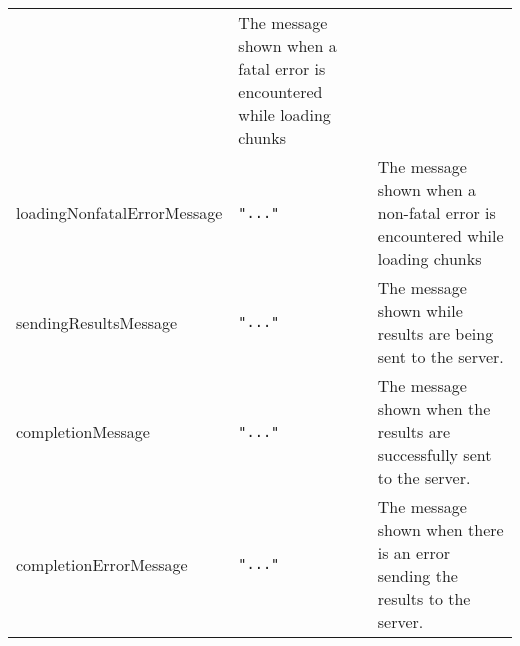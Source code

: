 \documentclass[
]{article}
\begin{document}
\begin{RaggedRight}
\begin{longtable}[]{p{1.7in}p{1in}p{3.15in}}
\begin{minipage}[t]{0.28\columnwidth}
\end{minipage} & \begin{minipage}[t]{0.37\columnwidth}\raggedright
The message shown when a fatal error is encountered while loading
chunks\strut
\end{minipage}\tabularnewline
\begin{minipage}[t]{0.26\columnwidth}\raggedright
loadingNonfatalErrorMessage\strut
\end{minipage} & \begin{minipage}[t]{0.28\columnwidth}\raggedright
\texttt{"..."}\strut
\end{minipage} & \begin{minipage}[t]{0.37\columnwidth}\raggedright
The message shown when a non-fatal error is encountered while loading
chunks\strut
\end{minipage}\tabularnewline
\begin{minipage}[t]{0.26\columnwidth}\raggedright
sendingResultsMessage\strut
\end{minipage} & \begin{minipage}[t]{0.28\columnwidth}\raggedright
\texttt{"..."}\strut
\end{minipage} & \begin{minipage}[t]{0.37\columnwidth}\raggedright
The message shown while results are being sent to the server.\strut
\end{minipage}\tabularnewline
\begin{minipage}[t]{0.26\columnwidth}\raggedright
completionMessage\strut
\end{minipage} & \begin{minipage}[t]{0.28\columnwidth}\raggedright
\texttt{"..."}\strut
\end{minipage} & \begin{minipage}[t]{0.37\columnwidth}\raggedright
The message shown when the results are successfully sent to the
server.\strut
\end{minipage}\tabularnewline
\begin{minipage}[t]{0.26\columnwidth}\raggedright
completionErrorMessage\strut
\end{minipage} & \begin{minipage}[t]{0.28\columnwidth}\raggedright
\texttt{"..."}\strut
\end{minipage} & \begin{minipage}[t]{0.37\columnwidth}\raggedright
The message shown when there is an error sending the results to the
server.\strut
\end{minipage}\tabularnewline

\end{longtable}
\end{RaggedRight}
\end{document}
